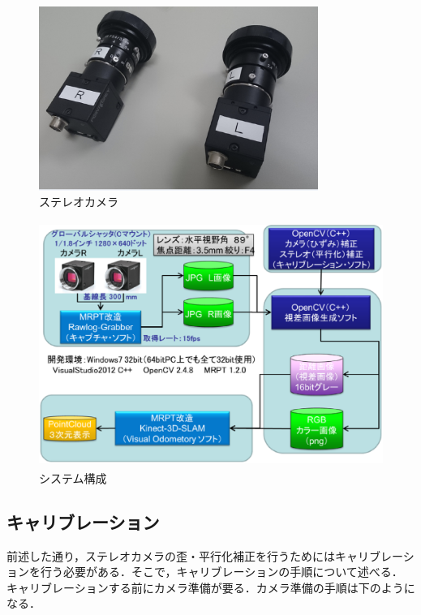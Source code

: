 \vspace{5mm}
\begin{figure}[htbp]
  \begin{center}
   \includegraphics[height=60mm]{figure/ステレオカメラ.eps}
   \caption{ステレオカメラ}
   \label{ステレオカメラ}
  \end{center}
\end{figure}

\newpage

\vspace{5mm}
\begin{figure}[htbp]
  \begin{center}
   \includegraphics[height=80mm]{figure/システム構成.eps}
   \caption{システム構成}
   \label{システム構成}
  \end{center}
\end{figure}

\subsection{キャリブレーション}
前述した通り，ステレオカメラの歪・平行化補正を行うためにはキャリブレーションを行う必要がある．そこで，キャリブレーションの手順について述べる．
キャリブレーションする前にカメラ準備が要る．カメラ準備の手順は下のようになる．

